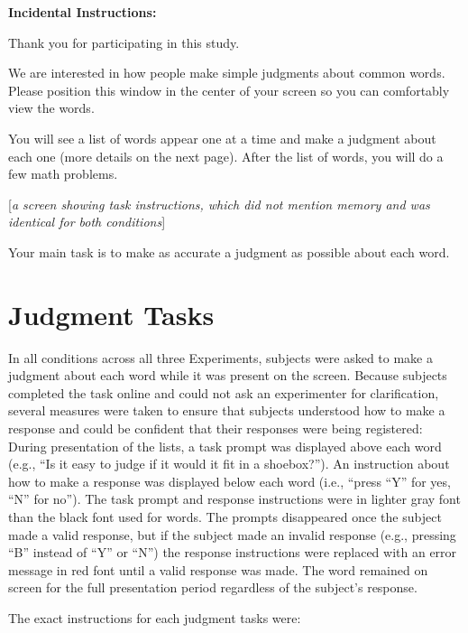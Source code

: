 \documentclass[man,natbib,floatsintext]{apa6} %
\begin{document}
\textbf{Incidental Instructions:}

\begin{displayquote}
        Thank you for participating in this study.

        We are interested in how people make simple judgments about common words.
        Please position this window in the center of your screen so you can comfortably view the words.

        You will see a list of words appear one at a time and make a judgment about each one
        (more details on the next page). After the list of words, you will do a few math problems.
        
        [\textit{a screen showing task instructions, which did not mention memory and was identical for both conditions}]

        Your main task is to make as accurate a judgment as possible about each word.
\end{displayquote}

\section{Judgment Tasks} 
In all conditions across all three Experiments, subjects were asked to make a judgment about each word while it was present on the screen. Because subjects completed the task online and could not ask an experimenter for clarification, several measures were taken to ensure that subjects understood how to make a response and could be confident that their responses were being registered: During presentation of the lists, a task prompt was displayed above each word (e.g., ``Is it easy to judge if it would it fit in a shoebox?''). An instruction about how to make a response was displayed below each word (i.e., ``press ``Y'' for yes, ``N'' for no''). The task prompt and response instructions were in lighter gray font than the black font used for words. The prompts disappeared once the subject made a valid response, but if the subject made an invalid response (e.g., pressing ``B'' instead of ``Y'' or ``N'') the response instructions were replaced with an error message in red font until a valid response was made. The word remained on screen for the full presentation period regardless of the subject's response.

The exact instructions for each judgment tasks were:
\end{document}
